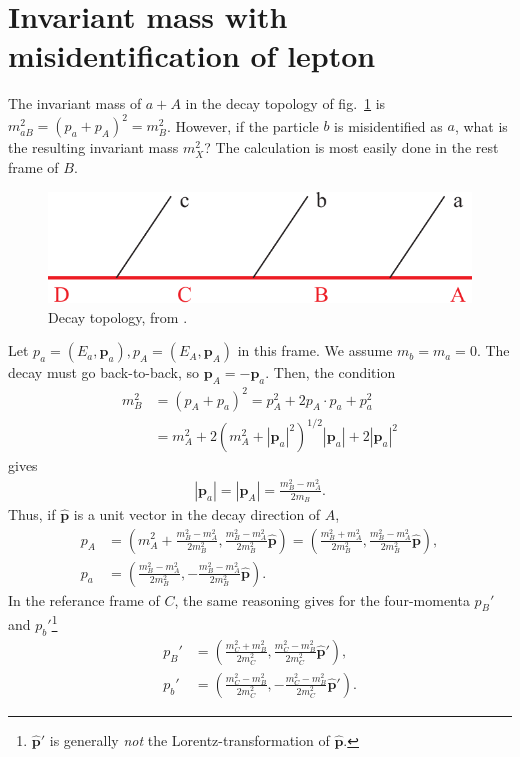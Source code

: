 \documentclass[twoside,english]{uiofysmaster}
\begin{document}
\section{Invariant mass with misidentification of lepton}
\label{sec:appendix_invmass-calculations}
The invariant mass of $a + A$ in the decay topology of fig.\ \ref{fig:decaytree_appendix} is $m_{aB}^2 = (p_a + p_A)^2 = m_B^2$. However, if the particle $b$ is misidentified as $a$, what is the resulting invariant mass $m_X^2$? The calculation is most easily done in the rest frame of $B$. 
\begin{figure}[hbt]
\centering
\includegraphics[scale=0.7]{figures/fig-chain.pdf} %
\caption{Decay topology, from \cite{Miller:2005zp}.}
\label{fig:decaytree_appendix}
\end{figure}Let $p_a = (E_a, \mathbf p_a), p_A = (E_A, \mathbf p_A)$ in this frame. We assume $m_b = m_a = 0$. The decay must go back-to-back, so $\mathbf p_A = -\mathbf p_a$. Then, the condition
\begin{align}
	m_B^2 &= (p_A + p_a)^2 = p_A^2 + 2p_A \cdot p_a + p_a^2\\
	 		&= m_A^2 + 2\left( m_A^2 + |\mathbf p_a|^2 \right)^{1/2} |\mathbf p_a| + 2|\mathbf p_a|^2 
\end{align}
gives
\begin{align}
	|\mathbf{p}_a| = |\mathbf{p}_A| = \frac{m_B^2 - m_A^2}{2m_B}.
\end{align}
Thus, if $\hat{\mathbf{p}}$ is a unit vector in the decay direction of $A$,
\begin{align}
	p_A &= \left( m_A^2 + \frac{m_B^2-m_A^2}{2m_B^2},  \frac{m_B^2-m_A^2}{2m_B^2}\hat{\mathbf{p}} \right) = \left( \frac{m_B^2+m_A^2}{2m_B^2},  \frac{m_B^2-m_A^2}{2m_B^2} \hat{\mathbf{p}} \right),\\
	p_a &= \left( \frac{m_B^2-m_A^2}{2m_B^2},  -\frac{m_B^2-m_A^2}{2m_B^2}\hat{\mathbf{p}} \right). \nonumber
\end{align}
In the referance frame of $C$, the same reasoning gives for the four-momenta $p_B'$ and $p_b'$\footnote{$\hat{\mathbf{p}}'$ is generally {\it not} the Lorentz-transformation of $\hat{\mathbf{p}}$.}
\begin{align}
	p_B' &= \left( \frac{m_C^2+m_B^2}{2m_C^2}, \frac{m_C^2-m_B^2}{2m_C^2} \hat{\mathbf{p}}' \right),\\
	p_b' &= \left( \frac{m_C^2-m_B^2}{2m_C^2}, -\frac{m_C^2-m_B^2}{2m_C^2} \hat{\mathbf{p}}' \right). \nonumber
\end{align}
\end{document}
